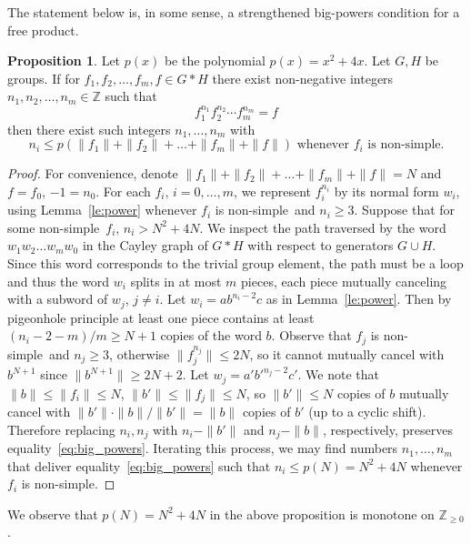 \documentclass[10pt]{amsart}
\theoremstyle{definition}
\newtheorem{proposition}[theorem]{Proposition}
\def\nondumb{non-simple} %
\begin{document}
The statement below is, in some sense, a strengthened big-powers condition for a free product.
\begin{proposition}\label{pr:big_power}
Let $p(x)$ be the polynomial $p(x)=x^2+4x$. Let $G,H$ be groups. If for $f_1,f_2,\ldots, f_m, f\in G*H$ there exist non-negative integers $n_1,n_2,\ldots,n_m\in\mathbb Z$ such that
\begin{equation}\label{eq:big_powers}
f_1^{n_1}f_2^{n_2}\cdots f_m^{n_m}=f
\end{equation}
then there exist such integers $n_1,\ldots,n_m$ with
$$n_i\le p(\|f_1\|+\|f_2\|+\ldots+\|f_m\|+\|f\|)\mbox{ whenever } f_i\mbox{ is \nondumb}.
$$
\end{proposition}
\begin{proof} For convenience, denote $\|f_1\|+\|f_2\|+\ldots+\|f_m\|+\|f\|=N$ and $f=f_0$, $-1=n_0$.
For each $f_i$, $i=0,\ldots,m$, we represent $f_i^{n_i}$ by its normal form $w_i$, using Lemma~\ref{le:power} whenever $f_i$ is \nondumb\ and $n_i\ge 3$. Suppose that for some \nondumb\ $f_i$, $n_i > N^2+4N$. We inspect the path traversed by the word $w_1w_2\ldots w_mw_0$  in the Cayley graph of $G*H$ with respect to generators $G\cup H$. Since this word corresponds to the trivial group element, the path must be a loop and thus the word $w_i$ splits in at most $m$ pieces, each piece mutually canceling with a subword of $w_j$, $j\neq i$. Let $w_i=ab^{n_i-2}c$ as in Lemma~\ref{le:power}. Then by pigeonhole principle at least one piece contains at least $(n_i-2-m)/m\ge N+1$ copies of the word $b$. Observe that $f_j$ is \nondumb\ and $n_j\ge 3$, otherwise $\|f_j^{n_j}\|\le 2N$, so it cannot mutually cancel with $b^{N+1}$ since $\|b^{N+1}\|\ge 2N+2$. Let $w_j=a'{b'}^{n_j-2}c'$. We note that $\|b\|\le \|f_i\|\le N$, $\|b'\|\le \|f_j\|\le N$, so $\|b'\|\le N$ copies of $b$ mutually cancel with $\|b'\|\cdot\|b\|/\|b'\|=\|b\|$ copies of $b'$ (up to a cyclic shift). Therefore replacing $n_i,n_j$ with $n_i-\|b'\|$ and $n_j-\|b\|$, respectively, preserves equality~\eqref{eq:big_powers}. Iterating this process, we may find numbers $n_1,\ldots, n_m$ that deliver equality~\eqref{eq:big_powers} such that $n_i\le p(N)=N^2+4N$ whenever $f_i$ is \nondumb.
\end{proof}
We observe that $p(N)=N^2+4N$ in the above proposition is monotone on $\mathbb{Z}_{\ge 0}$.
\end{document}
